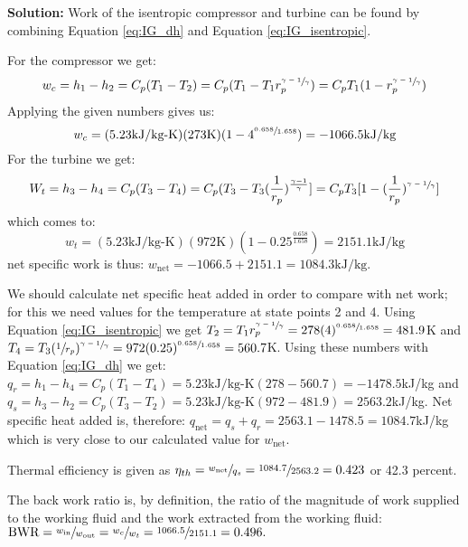 \begin{fullwidth}
\textbf{Solution:} 
Work of the isentropic compressor and turbine can be found by combining Equation \ref{eq:IG_dh} and Equation \ref{eq:IG_isentropic}.  

For the compressor we get:
$$w_c = h_1 - h_2 = C_p(T_1 - T_2) = C_p(T_1 - T_1 r_p^{\sfrac{\gamma - 1}{\gamma}}) = C_p T_1 (1 - r_p^{\sfrac{\gamma - 1}{\gamma}})$$
Applying the given numbers gives us:
$$w_c = (5.23 \text{kJ/kg-K})(273 \text{K})(1-4^{\sfrac{0.658}{1.658}}) = -1066.5 \text{kJ/kg}$$
For the turbine we get:
$$W_t = h_3 - h_4 = C_p(T_3 - T_4) = C_p(T_3 - T_3(\frac{1}{r_p})^{\frac{\gamma-1}{\gamma}}] = C_p T_3 [1 - (\frac{1}{r_p})^{\sfrac{\gamma-1}{\gamma}}]$$
which comes to:
$$w_t = (5.23 \text{kJ/kg-K})(972 \text{K})(1 - 0.25^{\frac{0.658}{1.658}}) = 2151.1 \text{kJ/kg}$$
net specific work is thus: $w_{\text{net}}=-1066.5 + 2151.1 = 1084.3 \text{kJ/kg}$.

\vspace{0.5cm}

We should calculate net specific heat added in order to compare with net work; for this we need values for the temperature at state points 2 and 4.  Using Equation \ref{eq:IG_isentropic} we get $T_2 = T_1 r_p^{\sfrac{\gamma-1}{\gamma}} = 278(4)^{\sfrac{0.658}{1.658}}=481.9$K and $T_4 = T_3 (\sfrac{1}{r_p})^{\sfrac{\gamma - 1}{\gamma}} = 972(0.25)^{\sfrac{0.658}{1.658}} = 560.7$K.  
Using these numbers with Equation \ref{eq:IG_dh} we get: $q_r = h_1 - h_4 = C_p(T_1 - T_4) = 5.23 \text{kJ/kg-K}(278 - 560.7) = -1478.5$kJ/kg and $q_s = h_3 - h_2 = C_p(T_3 - T_2) = 5.23 \text{kJ/kg-K}(972 - 481.9) = 2563.2$kJ/kg. 
Net specific heat added is, therefore: $q_{\text{net}} = q_s + q_r = 2563.1 - 1478.5 = 1084.7$kJ/kg which is very close to our calculated value for $w_{\text{net}}$.  

\vspace{0.5cm}
Thermal efficiency is given as $\eta_{th} = \sfrac{w_{\text{net}}}{q_s} = \sfrac{1084.7}{2563.2} = 0.423$ or 42.3 percent.

\vspace{0.5cm} 

The back work ratio is, by definition, the ratio of the magnitude of work supplied to the working fluid and the work extracted from the working fluid: $\text{BWR} = \sfrac{w_{\text{in}}}{w_{\text{out}}} = \sfrac{w_c}{w_t} = \sfrac{1066.5}{2151.1} = 0.496.$
\end{fullwidth}

